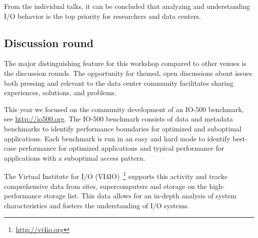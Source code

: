 \documentclass{llncs}
\begin{document}
From the individual talks, it can be concluded that analyzing and understanding I/O behavior is the top priority for researchers and data centers.


\subsection{Discussion round}

The major distinguishing feature for this workshop compared to other venues is the discussion rounds.
The opportunity for themed, open discussions about issues both pressing and relevant to the data center
community facilitates sharing experiences, solutions, and problems.

This year we focused on the community development of an IO-500 benchmark, see \url{http://io500.org}.
The IO-500 benchmark consists of data and metadata benchmarks to identify performance boundaries for optimized and suboptimal applications.
Each benchmark is run in an easy and hard mode to identify best-case performance for optimized applications and typical performance for applications with a suboptimal access pattern.

The Virtual Institute for I/O (VI4IO)~\footnote{\url{http://vi4io.org}} supports this activity and tracks comprehensive data from sites, supercomputers and storage on the high-performance storage list.
This data allows for an in-depth analysis of system characteristics and fosters the understanding of I/O systems.



\end{document}
